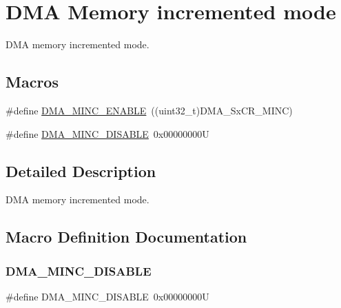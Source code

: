 \hypertarget{group___d_m_a___memory__incremented__mode}{}\section{D\+MA Memory incremented mode}
\label{group___d_m_a___memory__incremented__mode}


D\+MA memory incremented mode.  


\subsection*{Macros}
\begin{DoxyCompactItemize}
\item 
\#define \mbox{\hyperlink{group___d_m_a___memory__incremented__mode_ga43d30885699cc8378562316ff4fed1cd}{D\+M\+A\+\_\+\+M\+I\+N\+C\+\_\+\+E\+N\+A\+B\+LE}}~((uint32\+\_\+t)D\+M\+A\+\_\+\+Sx\+C\+R\+\_\+\+M\+I\+NC)
\item 
\#define \mbox{\hyperlink{group___d_m_a___memory__incremented__mode_ga32625330516c188151743473fad97a33}{D\+M\+A\+\_\+\+M\+I\+N\+C\+\_\+\+D\+I\+S\+A\+B\+LE}}~0x00000000U
\end{DoxyCompactItemize}


\subsection{Detailed Description}
D\+MA memory incremented mode. 



\subsection{Macro Definition Documentation}
\mbox{\label{group___d_m_a___memory__incremented__mode_ga32625330516c188151743473fad97a33}} 
\subsubsection{\texorpdfstring{D\+M\+A\+\_\+\+M\+I\+N\+C\+\_\+\+D\+I\+S\+A\+B\+LE}{DMA\_MINC\_DISABLE}}
{\footnotesize\ttfamily \#define D\+M\+A\+\_\+\+M\+I\+N\+C\+\_\+\+D\+I\+S\+A\+B\+LE~0x00000000U}

